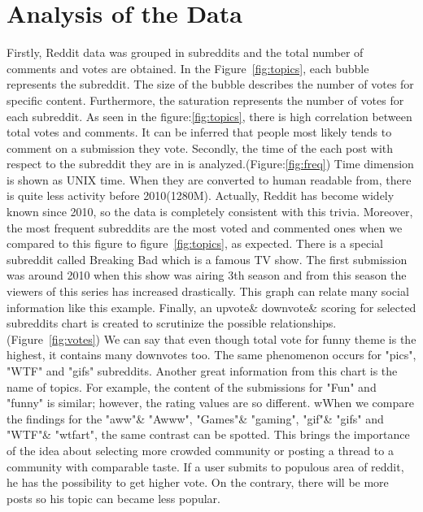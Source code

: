 \documentclass[a4paper]{article}
\begin{document}
\section{Analysis of the Data}
Firstly, Reddit data was grouped in subreddits and the total number of comments and votes are obtained. In the Figure~\ref{fig:topics}, each bubble represents the subreddit. The size of the bubble describes the number of votes for specific content. Furthermore, the saturation represents the number of votes for each subreddit. As seen in the figure:\ref{fig:topics}, there is high correlation between total votes and comments. It can be inferred that people most likely tends to comment on a submission they vote. 
Secondly, the time of the each post with respect to the subreddit they are in is analyzed.(Figure:\ref{fig:freq}) Time dimension is shown as UNIX time. When they are converted to human readable from, there is quite less activity before 2010(1280M). Actually, Reddit has become widely known since 2010, so the data is completely consistent with this trivia. Moreover, the most frequent subreddits are the most voted and commented ones when we compared to this figure to figure~\ref{fig:topics}, as expected. There is a special subreddit called Breaking Bad which is a famous TV show. The first submission was around 2010 when this show was airing 3th season and from this season the viewers of this series has increased drastically. This graph can relate many social information like this example. 
Finally, an upvote\& downvote\& scoring for selected subreddits chart is created to scrutinize the possible relationships.(Figure~\ref{fig:votes}) We can say that even though total vote for funny theme is the highest, it contains many downvotes too. The same phenomenon occurs for "pics", "WTF" and "gifs" subreddits. Another great information from this chart is the name of topics. For example, the content of the submissions for "Fun" and "funny" is similar; however, the rating values are so different. wWhen we compare the findings for the "aww"\& "Awww", "Games"\& "gaming", "gif"\& "gifs" and "WTF"\& "wtfart", the same contrast can be spotted. This brings the importance of the idea about selecting more crowded community or posting a thread to a community with comparable taste. If a user submits to populous area of reddit, he has the possibility to get higher vote. On the contrary, there will be more posts so his topic can became less popular. 
\end{document}
